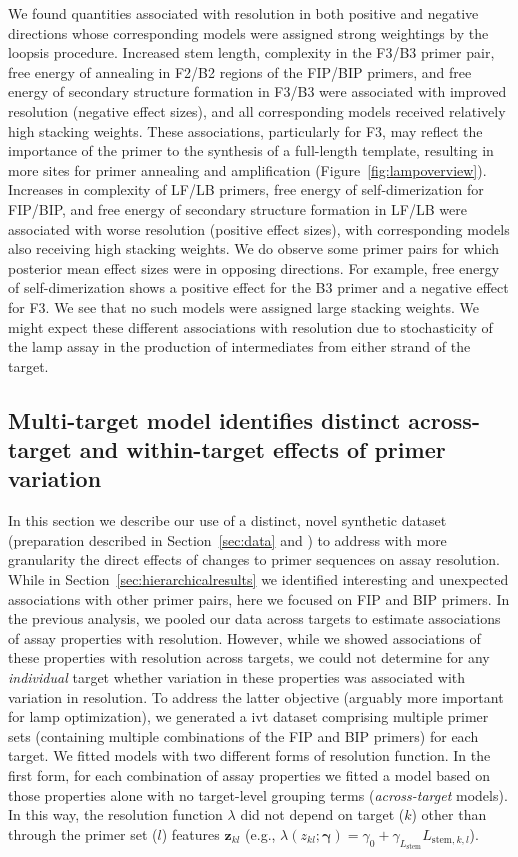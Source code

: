 \documentclass[../thesis.tex]{subfiles}
\begin{document}
We found quantities associated with resolution in both positive and negative directions whose corresponding models were assigned strong weightings by the \gls{loopsis} procedure. Increased stem length, complexity in the F3/B3 primer pair, free energy of annealing in F2/B2 regions of the FIP/BIP primers, and free energy of secondary structure formation in F3/B3 were associated with improved resolution (negative effect sizes), and all corresponding models received relatively high stacking weights. These associations, particularly for F3, may reflect the importance of the primer to the synthesis of a full-length template, resulting in more sites for primer annealing and amplification (Figure~\ref{fig:lampoverview}). Increases in complexity of LF/LB primers, free energy of self-dimerization for FIP/BIP, and free energy of secondary structure formation in LF/LB were associated with worse resolution (positive effect sizes), with corresponding models also receiving high stacking weights. We do observe some primer pairs for which posterior mean effect sizes were in opposing directions. For example, free energy of self-dimerization shows a positive effect for the B3 primer and a negative effect for F3. We see that no such models were assigned large stacking weights. We might expect these different associations with resolution due to stochasticity of the \gls{lamp} assay in the production of intermediates from either strand of the target.

\subsection{Multi-target model identifies distinct across-target and within-target effects of primer variation \label{sec:ivt_results}}
In this section we describe our use of a distinct, novel synthetic dataset (preparation described in Section~\ref{sec:data} and \citealp{remmel_diagnostic_2022}) to address with more granularity the direct effects of changes to primer sequences on assay resolution. While in Section~\ref{sec:hierarchicalresults} we identified interesting and unexpected associations with other primer pairs, here we focused on FIP and BIP primers. In the previous analysis, we pooled our data across targets to estimate associations of assay properties with resolution. However, while we showed associations of these properties with resolution across targets, we could not determine for any \emph{individual} target whether variation in these properties was associated with variation in resolution. To address the latter objective (arguably more important for \gls{lamp} optimization), we generated a \gls{ivt}  dataset comprising multiple primer sets (containing multiple combinations of the FIP and BIP primers) for each target. We fitted models with two different forms of resolution function. In the first form, for each combination of assay properties we fitted a model based on those properties alone with no target-level grouping terms (\emph{across-target} models). In this way, the resolution function $\lambda$ did not depend on target ($k$) other than through the primer set ($l$) features $\bm{z}_{kl}$ (e.g., $\lambda(z_{kl}; \bm{\gamma}) = \gamma_0 + \gamma_{L_{\text{stem}}} L_{\text{stem},k,l}$).
 
\end{document}
